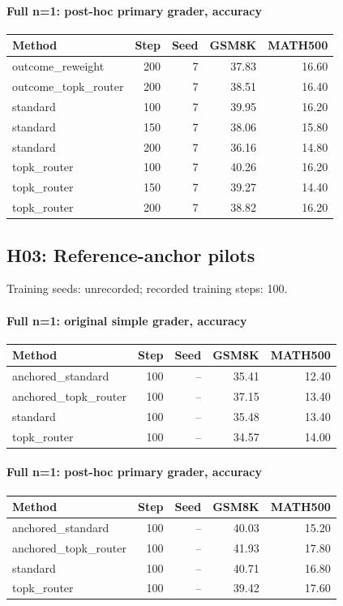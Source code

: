 \paragraph{Full n=1: post-hoc primary grader, accuracy}
{\footnotesize\setlength{\tabcolsep}{3.5pt}
\begin{longtable}{@{}p{1.4in}rrrr@{}}
\toprule
Method & Step & Seed & GSM8K & MATH500 \\
\midrule\endhead
outcome\_\allowbreak{}reweight & 200 & 7 & 37.83 & 16.60 \\
outcome\_\allowbreak{}topk\_\allowbreak{}router & 200 & 7 & 38.51 & 16.40 \\
standard & 100 & 7 & 39.95 & 16.20 \\
standard & 150 & 7 & 38.06 & 15.80 \\
standard & 200 & 7 & 36.16 & 14.80 \\
topk\_\allowbreak{}router & 100 & 7 & 40.26 & 16.20 \\
topk\_\allowbreak{}router & 150 & 7 & 39.27 & 14.40 \\
topk\_\allowbreak{}router & 200 & 7 & 38.82 & 16.20 \\
\bottomrule\end{longtable}
}
\subsection{H03: Reference-anchor pilots}
\label{history:early_anchor100}
Training seeds: unrecorded; recorded training steps: 100.
\paragraph{Full n=1: original simple grader, accuracy}
{\footnotesize\setlength{\tabcolsep}{3.5pt}
\begin{longtable}{@{}p{1.4in}rrrr@{}}
\toprule
Method & Step & Seed & GSM8K & MATH500 \\
\midrule\endhead
anchored\_\allowbreak{}standard & 100 & -- & 35.41 & 12.40 \\
anchored\_\allowbreak{}topk\_\allowbreak{}router & 100 & -- & 37.15 & 13.40 \\
standard & 100 & -- & 35.48 & 13.40 \\
topk\_\allowbreak{}router & 100 & -- & 34.57 & 14.00 \\
\bottomrule\end{longtable}
}
\paragraph{Full n=1: post-hoc primary grader, accuracy}
{\footnotesize\setlength{\tabcolsep}{3.5pt}
\begin{longtable}{@{}p{1.4in}rrrr@{}}
\toprule
Method & Step & Seed & GSM8K & MATH500 \\
\midrule\endhead
anchored\_\allowbreak{}standard & 100 & -- & 40.03 & 15.20 \\
anchored\_\allowbreak{}topk\_\allowbreak{}router & 100 & -- & 41.93 & 17.80 \\
standard & 100 & -- & 40.71 & 16.80 \\
topk\_\allowbreak{}router & 100 & -- & 39.42 & 17.60 \\
\bottomrule\end{longtable}
}
